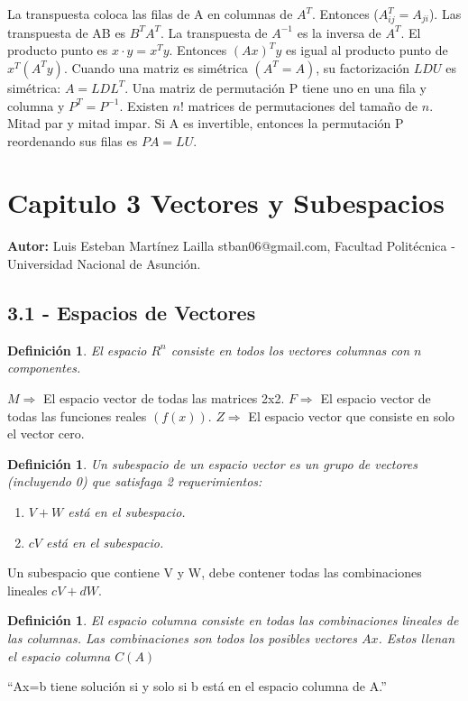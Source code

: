 \documentclass[]{article}
\newtheorem{definicion}[def1]{Definición}
\begin{document}
La transpuesta coloca las filas de A en columnas de $A^{T}$. Entonces ($A^{T}_{ij}=A_{ji}$).
Las transpuesta de AB es $B^{T}A^{T}$. La transpuesta de $A^{-1}$ es la inversa de $A^{T}$.
El producto punto es $x \cdot y=x^{T}y$. Entonces $(Ax)^{T}y$ es igual al producto punto de $x^{T}(A^{T}y)$.
Cuando una matriz es simétrica $(A^{T}=A)$, su factorización $LDU$ es simétrica: $A=L D L^{T}$.
Una matriz de permutación P tiene uno en una fila y columna y $P^{T}=P^{-1}$.
Existen $n!$ matrices de permutaciones del tamaño de $n$. Mitad par y mitad impar.
Si A es invertible, entonces la permutación P reordenando sus filas es $PA=LU$.

\section{Capitulo 3 Vectores y Subespacios}

\textbf{Autor:} Luis Esteban Mart\'inez Lailla stban06@gmail.com, Facultad Polit\'ecnica - Universidad Nacional de Asunci\'on.

\subsection{3.1 - Espacios de Vectores}
\begin{definicion}
	El espacio $R^n$ consiste en todos los vectores columnas con $n$ componentes.
\end{definicion}

$M \Rightarrow$ El espacio vector de todas las matrices 2x2.
$F \Rightarrow$ El espacio vector de todas las funciones reales $(f(x))$.
$Z \Rightarrow$ El espacio vector que consiste en solo el vector cero.

\begin{definicion}
	Un subespacio de un espacio vector es un grupo de vectores (incluyendo 0) que satisfaga 2 requerimientos:
	\begin{enumerate}
		\item $V + W $ est\'a en el subespacio.
		\item $cV$ est\'a en el subespacio.
	\end{enumerate}
\end{definicion}
Un subespacio que contiene V y W, debe contener todas las combinaciones lineales $cV+dW$.

\begin{definicion}
	El espacio columna consiste en todas las combinaciones lineales de las columnas. Las combinaciones son todos los posibles vectores $Ax$. Estos llenan el espacio columna $C(A)$
\end{definicion}
``Ax=b tiene soluci\'on si y solo si b est\'a en el espacio columna de A.''
\end{document}
